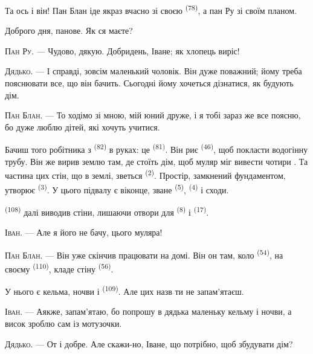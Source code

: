 Та ось і він! Пан Блан іде якраз вчасно зі своєю 
\textsuperscript{(78)}, а пан Ру зі своїм планом.

Доброго дня, панове. Як ся маєте?

\textsc{Пан Ру}. --- Чудово, дякую. Добридень, Іване; як хлопець виріс!

\textsc{Дядько}. --- І справді, зовсім маленький чоловік. Він дуже поважний;
йому треба пояснювати все, що він бачить. Сьогодні йому хочеться дізнатися, як
будують дім.

\VUsaut{3.0mm}

\textsc{Пан Блан}. --- То ходімо зі мною, мій юний друже, і я тобі зараз же все
поясню, бо дуже люблю дітей, які хочуть учитися.

Бачиш того робітника з  \textsuperscript{(82)} в руках: це
 \textsuperscript{(81)}. Він риє 
\textsuperscript{(46)}, щоб покласти водогінну трубу. Він же вирив землю там, де
стоїть дім, щоб муляр міг вивести чотири . Та частина цих стін, що
в землі, зветься  \textsuperscript{(2)}. Простір, замкнений
фундаментом, утворює  \textsuperscript{(3)}. У цього підвалу є
віконце, зване  \textsuperscript{(5)}, 
\textsuperscript{(4)} і сходи.

 \textsuperscript{(108)} далі виводив стіни, лишаючи отвори для
 \textsuperscript{(8)} і  \textsuperscript{(17)}.

\textsc{Іван}. --- Але я його не бачу, цього муляра!

\textsc{Пан Блан}. --- Він уже скінчив працювати на домі. Він он там, коло
 \textsuperscript{(54)}, на своєму 
\textsuperscript{(110)}, кладе стіну  \textsuperscript{(56)}.

У нього є кельма, ночви і  \textsuperscript{(109)}. Але цих назв ти
не запам'ятаєш.

\textsc{Іван}. --- Аякже, запам'ятаю, бо попрошу в дядька маленьку кельму і
ночви, а висок зроблю сам із мотузочки.

\VUsaut{3.0mm}
\VUsaut{3.0mm}

\textsc{Дядько}. --- От і добре. Але скажи-но, Іване, що потрібно, щоб збудувати
дім?

